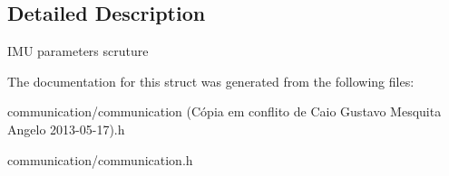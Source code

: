 \subsection{Detailed Description}
IMU parameters scruture 

The documentation for this struct was generated from the following files:\begin{DoxyCompactItemize}
\item 
communication/communication (Cópia em conflito de Caio Gustavo Mesquita Angelo 2013-\/05-\/17).h\item 
communication/communication.h\end{DoxyCompactItemize}
